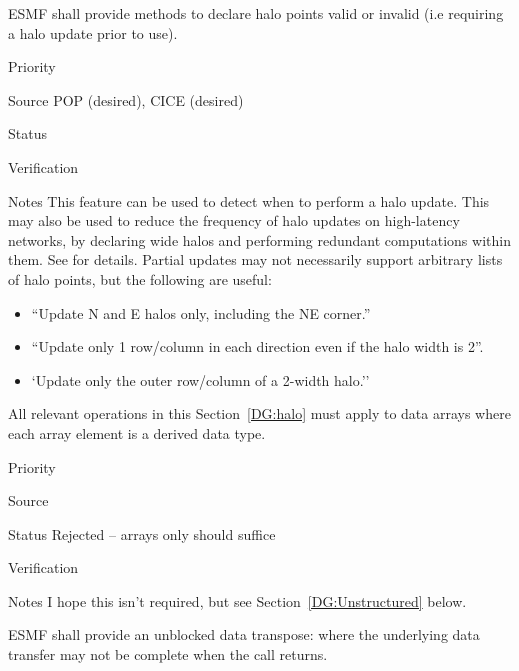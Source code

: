 
ESMF shall provide methods to declare halo points valid or invalid
(i.e requiring a halo update prior to use).

\begin{reqlist}
\item[Priority]
\item[Source] POP (desired), CICE (desired) 
\item[Status]
\item[Verification]
\item[Notes] This feature can be used to detect when to perform a halo
  update. This may also be used to reduce the frequency of halo
  updates on high-latency networks, by declaring wide halos and
  performing redundant computations within them. See \cite{ref:b2001}
  for details. Partial updates may not necessarily support
  arbitrary lists of halo points, but the following are useful:
  \begin{itemize}
  \item ``Update N and E halos only, including the NE corner.''
  \item ``Update only 1 row/column in each direction even if the halo
    width is 2''.
  \item `Update only the outer row/column of a 2-width halo.''
  \end{itemize}
\end{reqlist}


All relevant operations in this Section~\ref{DG:halo} must apply to
data arrays where each array element is a derived data type.

\begin{reqlist}
\item[Priority]
\item[Source]
\item[Status] Rejected -- arrays only should suffice
\item[Verification]
\item[Notes] I hope this isn't required, but see
  Section~\ref{DG:Unstructured} below.
\end{reqlist}

 \label{DG:transpose}


ESMF shall provide an unblocked data transpose: where the underlying
data transfer may not be complete when the call returns.

